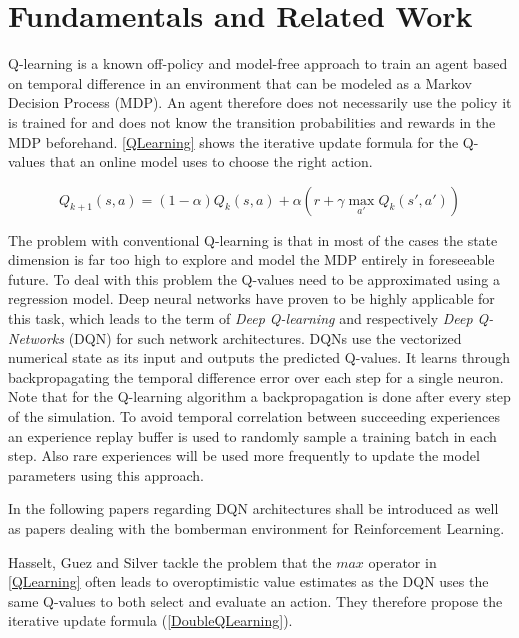 \section{Fundamentals and Related Work} \label{fundamentals_related_work}

Q-learning is a known off-policy and model-free approach to train an agent based on temporal difference in an environment that can be modeled as a Markov Decision Process (MDP). An agent therefore does not necessarily use the policy it is trained for and does not know the transition probabilities and rewards in the MDP beforehand. \autoref{QLearning} shows the iterative update formula for the Q-values that an online model uses to choose the right action. \cite{Geron2018}

\begin{equation} \label{QLearning}
	Q_{k+1}(s,a) = (1-\alpha) Q_k(s,a) + \alpha(r + \gamma \max_{a'} Q_k(s',a')) 
\end{equation}

The problem with conventional Q-learning is that in most of the cases the state dimension is far too high to explore and model the MDP entirely in foreseeable future. To deal with this problem the Q-values need to be approximated using a regression model. Deep neural networks have proven to be highly applicable for this task, which leads to the term of \textit{Deep Q-learning} and respectively \textit{Deep Q-Networks} (DQN) for such network architectures. DQNs use the vectorized numerical state as its input and outputs the predicted Q-values. It learns through backpropagating the temporal difference error over each step for a single neuron. Note that for the Q-learning algorithm a backpropagation is done after every step of the simulation. To avoid temporal correlation between succeeding experiences an experience replay buffer is used to randomly sample a training batch in each step. Also rare experiences will be used more frequently to update the model parameters using this approach. \cite{Geron2018}

In the following papers regarding DQN architectures shall be introduced as well as papers dealing with the bomberman environment for Reinforcement Learning. 

Hasselt, Guez and Silver \cite{vanHasselt2015} tackle the problem that the $max$ operator in \autoref{QLearning} often leads to overoptimistic value estimates as the DQN uses the same Q-values to both select and evaluate an action. They therefore propose the iterative update formula (\ref{DoubleQLearning}).

